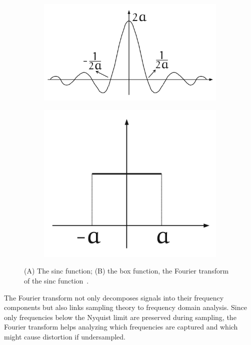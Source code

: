 \begin{figure}[!h]
  \centering
  \begin{subfigure}[b]{0.48\textwidth}
      \centering
      \includegraphics[width=\textwidth]{img/ch2/sinc.png}
      \caption{}
  \end{subfigure}
  \begin{subfigure}[b]{0.32\textwidth}
      \centering
      \includegraphics[width=\textwidth]{img/ch2/box.png}
      \caption{}
  \end{subfigure}
  \caption{(A) The sinc function; (B) the box function, the Fourier transform of the sinc function~\citep{ipcgVelho2014}.}
  \label{f:sinc-and-rect}
\end{figure}


The Fourier transform not only decomposes signals into their frequency components but also links sampling theory to frequency domain analysis. Since only frequencies below the Nyquist limit are preserved during sampling, the Fourier transform helps analyzing which frequencies are captured and which might cause distortion if undersampled.

